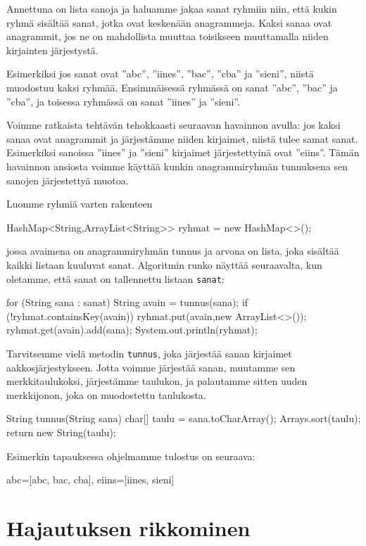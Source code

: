 Annettuna on lista sanoja ja haluamme jakaa sanat ryhmiin niin,
että kukin ryhmä sisältää sanat, jotka ovat keskenään anagrammeja.
Kaksi sanaa ovat anagrammit, jos ne on mahdollista muuttaa toisikseen
muuttamalla niiden kirjainten järjestystä.

Esimerkiksi jos sanat ovat ''abc'', ''iines'', ''bac'', ''cba'' ja ''sieni'',
niistä muodostuu kaksi ryhmää.
Ensimmäisessä ryhmässä on sanat ''abc'', ''bac'' ja ''cba'',
ja toisessa ryhmässä on sanat ''iines'' ja ''sieni''.

Voimme ratkaista tehtävän tehokkaasti seuraavan havainnon avulla:
jos kaksi sanaa ovat anagrammit ja järjestämme niiden kirjaimet,
niistä tulee samat sanat.
Esimerkiksi sanoissa ''iines'' ja ''sieni'' kirjaimet
järjestettyinä ovat ''eiins''.
Tämän havainnon ansiosta voimme käyttää kunkin anagrammiryhmän
tunnuksena sen sanojen järjestettyä muotoa.

Luomme ryhmiä varten rakenteen

\begin{code}
HashMap<String,ArrayList<String>> ryhmat = new HashMap<>();
\end{code}

jossa avaimena on anagrammiryhmän tunnus ja arvona on lista,
joka sisältää kaikki listaan kuuluvat sanat.
Algoritmin runko näyttää seuraavalta, kun oletamme,
että sanat on tallennettu listaan \texttt{sanat}:

\begin{code}
for (String sana : sanat) {
    String avain = tunnus(sana);
    if (!ryhmat.containsKey(avain)) {
        ryhmat.put(avain,new ArrayList<>());
    }
    ryhmat.get(avain).add(sana);
}
System.out.println(ryhmat);
\end{code}

Tarvitsemme vielä metodin \texttt{tunnus}, joka järjestää
sanan kirjaimet aakkosjärjestykseen.
Jotta voimme järjestää sanan, muutamme sen merkkitaulukoksi,
järjestämme taulukon, ja palautamme sitten uuden merkkijonon,
joka on muodostettu taulukosta.

\begin{code}
String tunnus(String sana) {
    char[] taulu = sana.toCharArray();
    Arrays.sort(taulu);
    return new String(taulu);
}
\end{code}

Esimerkin tapauksessa ohjelmamme tulostus on seuraava:

\begin{code}
{abc=[abc, bac, cba], eiins=[iines, sieni]}
\end{code}

\section{Hajautuksen rikkominen}
